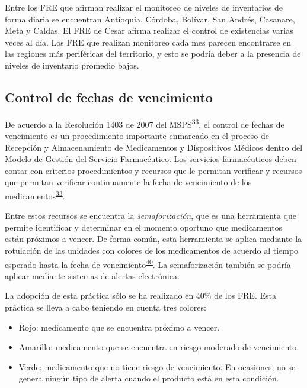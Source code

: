 \documentclass[
]{book}
\begin{document}
Entre los FRE que afirman realizar el monitoreo de niveles de inventarios de forma diaria se encuentran Antioquia, Córdoba, Bolívar, San Andrés, Casanare, Meta y Caldas. El FRE de Cesar afirma realizar el control de existencias varias veces al día. Los FRE que realizan monitoreo cada mes parecen encontrarse en las regiones más periféricas del territorio, y esto se podría deber a la presencia de niveles de inventario promedio bajos.

\hypertarget{control-de-fechas-de-vencimiento}{%
\subsection{Control de fechas de vencimiento}\label{control-de-fechas-de-vencimiento}}

De acuerdo a la Resolución 1403 de 2007 del MSPS\textsuperscript{\protect\hyperlink{ref-MinisteriodeSaludyProteccionSocial2007}{33}}, el control de fechas de vencimiento es un procedimiento importante enmarcado en el proceso de Recepción y Almacenamiento de Medicamentos y Dispositivos Médicos dentro del Modelo de Gestión del Servicio Farmacéutico. Los servicios farmacéuticos deben contar con criterios procedimientos y recursos que le permitan verificar y recursos que permitan verificar continuamente la fecha de vencimiento de los medicamentos\textsuperscript{\protect\hyperlink{ref-MinisteriodeSaludyProteccionSocial2007}{33}}.

Entre estos recursos se encuentra la \emph{semaforización}, que es una herramienta que permite identificar y determinar en el momento oportuno que medicamentos están próximos a vencer. De forma común, esta herramienta se aplica mediante la rotulación de las unidades con colores de los medicamentos de acuerdo al tiempo esperado hasta la fecha de vencimiento\textsuperscript{\protect\hyperlink{ref-HernandezVera2017}{40}}. La semaforización también se podría aplicar mediante sistemas de alertas electrónica.

La adopción de esta práctica sólo se ha realizado en 40\% de los FRE. Esta práctica se lleva a cabo teniendo en cuenta tres colores:

\begin{itemize}
\item
  Rojo: medicamento que se encuentra próximo a vencer.
\item
  Amarillo: medicamento que se encuentra en riesgo moderado de vencimiento.
\item
  Verde: medicamento que no tiene riesgo de vencimiento. En ocasiones, no se genera ningún tipo de alerta cuando el producto está en esta condición.
\end{itemize}
\end{document}
